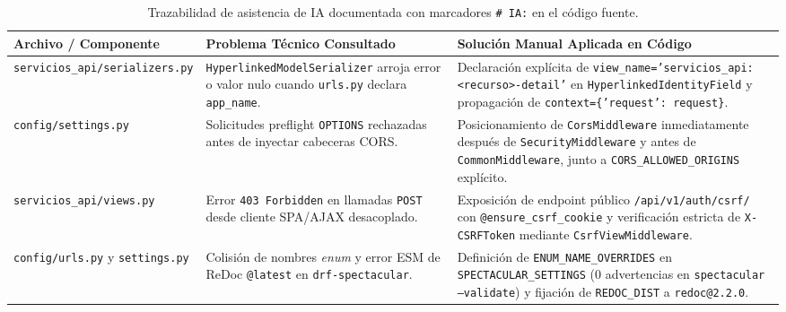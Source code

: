 \documentclass[10pt,a4paper]{article}
\begin{document}
\begin{table}[H]
\centering
\small
\begin{tabularx}{\textwidth}{p{3.9cm} p{4.6cm} X}
\toprule
\textbf{\color{uncpnavy}Archivo / Componente} & \textbf{\color{uncpnavy}Problema Técnico Consultado} & \textbf{\color{uncpnavy}Solución Manual Aplicada en Código} \\
\midrule
\texttt{servicios\_api/}\newline\texttt{serializers.py} & \texttt{HyperlinkedModelSerializer} arroja error o valor nulo cuando \texttt{urls.py} declara \texttt{app\_name}. & Declaración explícita de \texttt{view\_name='servicios\_api:}\newline\texttt{<recurso>-detail'} en \texttt{HyperlinkedIdentityField} y propagación de \texttt{context=\{'request': request\}}. \\
\addlinespace
\texttt{config/settings.py} & Solicitudes preflight \texttt{OPTIONS} rechazadas antes de inyectar cabeceras CORS. & Posicionamiento de \texttt{CorsMiddleware} inmediatamente después de \texttt{SecurityMiddleware} y antes de \texttt{CommonMiddleware}, junto a \texttt{CORS\_ALLOWED\_ORIGINS} explícito. \\
\addlinespace
\texttt{servicios\_api/}\newline\texttt{views.py} & Error \texttt{403 Forbidden} en llamadas \texttt{POST} desde cliente SPA/AJAX desacoplado. & Exposición de endpoint público \texttt{/api/v1/auth/csrf/} con \texttt{@ensure\_csrf\_cookie} y verificación estricta de \texttt{X-CSRFToken} mediante \texttt{CsrfViewMiddleware}. \\
\addlinespace
\texttt{config/urls.py} y \texttt{settings.py} & Colisión de nombres \textit{enum} y error ESM de ReDoc \texttt{@latest} en \texttt{drf-spectacular}. & Definición de \texttt{ENUM\_NAME\_OVERRIDES} en \texttt{SPECTACULAR\_SETTINGS} (0 advertencias en \texttt{spectacular --validate}) y fijación de \texttt{REDOC\_DIST} a \texttt{redoc@2.2.0}. \\
\bottomrule
\end{tabularx}
\caption{Trazabilidad de asistencia de IA documentada con marcadores \texttt{\# IA:} en el código fuente.}
\label{tab:registro_ia}
\end{table}
\end{document}
